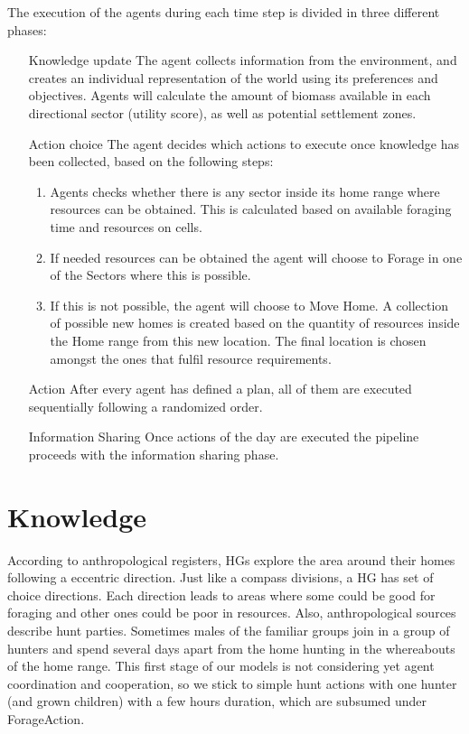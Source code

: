 \documentclass[11pt,oneside,a4paper,openright]{report}
\begin{document}
The execution of the agents during each time step is divided in three different phases:
\begin{enumerate}[1.]
	\item[Knowledge update]
	The agent collects information from the environment, and creates an individual representation of the
	world using its preferences and objectives. Agents will calculate the amount of biomass available in
	each directional sector (utility score), as well as potential settlement zones.
	\item[Action choice]
	The agent decides which actions to execute once knowledge has been collected, based on the
	following steps:
	\begin{enumerate}
		\item Agents checks whether there is any sector inside its home range where resources can be
		obtained. This is calculated based on available foraging time and resources on cells.
		\item If needed resources can be obtained the agent will choose to Forage in one of the Sectors
		where this is possible.
		\item If this is not possible, the agent will choose to Move Home. A collection of possible new homes
		is created based on the quantity of resources inside the Home range from this new location.
		The final location is chosen amongst the ones that fulfil resource requirements.
	\end{enumerate}
	\item[Action]
	After every agent has defined a plan, all of them are executed sequentially following a randomized
	order.
	\item[Information Sharing] 
	Once actions of the day are executed the pipeline proceeds with the information
	sharing phase.
\end{enumerate}


\section{Knowledge}

According to anthropological registers, HGs explore the area around their homes following a eccentric direction. Just like a compass divisions, a HG has set of choice directions. Each direction leads to areas where some could be good for foraging and other ones could be poor in resources. Also, anthropological sources describe hunt parties. Sometimes males of the familiar groups join in a group of hunters and spend several days apart from the home hunting in the whereabouts of the home range. This first stage of our models is not considering yet agent coordination and cooperation, so we stick to simple hunt actions with one hunter (and grown children) with a few hours duration, which
are subsumed under ForageAction.
 
\end{document}
